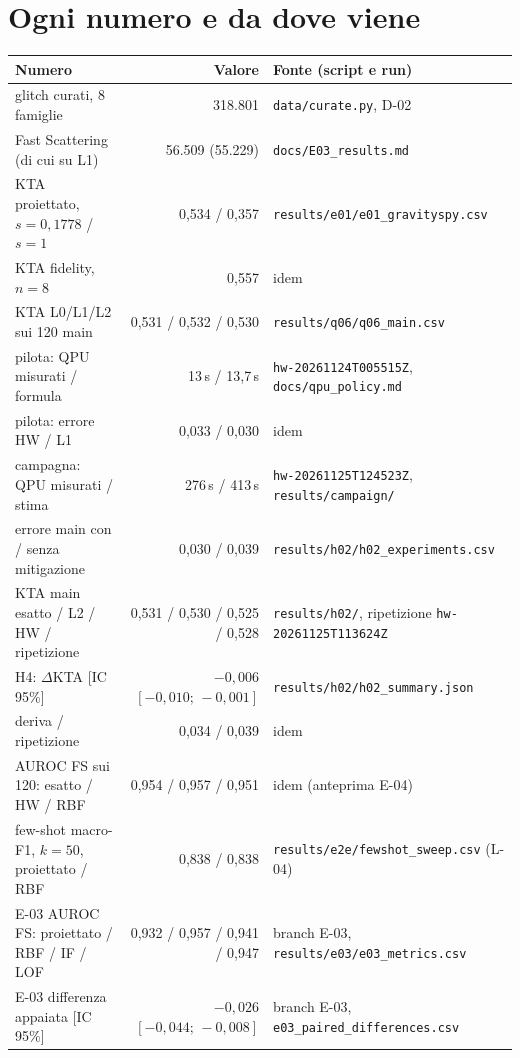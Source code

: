 \section{Ogni numero e da dove viene}
\label{app:numeri}

\begin{center}\small
\begin{tabularx}{\textwidth}{@{}>{\raggedright\arraybackslash}X r >{\raggedright\arraybackslash}p{6.2cm}@{}}
\toprule
Numero & Valore & Fonte (script e run)\\
\midrule
glitch curati, 8 famiglie & 318.801 & \texttt{data/curate.py}, D-02\\
Fast Scattering (di cui su L1) & 56.509 (55.229) & \texttt{docs/E03\_results.md}\\
KTA proiettato, $s=0{,}1778$ / $s=1$ & 0,534 / 0,357 & \texttt{results/e01/e01\_gravityspy.csv}\\
KTA fidelity, $n=8$ & 0,557 & idem\\
KTA L0/L1/L2 sui 120 main & 0,531 / 0,532 / 0,530 & \texttt{results/q06/q06\_main.csv}\\
pilota: QPU misurati / formula & 13\,s / 13,7\,s & \texttt{hw-20261124T005515Z}, \texttt{docs/qpu\_policy.md}\\
pilota: errore HW / L1 & 0,033 / 0,030 & idem\\
campagna: QPU misurati / stima & 276\,s / 413\,s & \texttt{hw-20261125T124523Z}, \texttt{results/campaign/}\\
errore main con / senza mitigazione & 0,030 / 0,039 & \texttt{results/h02/h02\_experiments.csv}\\
KTA main esatto / L2 / HW / ripetizione & 0,531 / 0,530 / 0,525 / 0,528 & \texttt{results/h02/}, ripetizione \texttt{hw-20261125T113624Z}\\
H4: $\Delta$KTA [IC 95\%] & $-0{,}006$ $[-0{,}010;\,-0{,}001]$ & \texttt{results/h02/h02\_summary.json}\\
deriva / ripetizione & 0,034 / 0,039 & idem\\
AUROC FS sui 120: esatto / HW / RBF & 0,954 / 0,957 / 0,951 & idem (anteprima E-04)\\
few-shot macro-F1, $k=50$, proiettato / RBF & 0,838 / 0,838 & \texttt{results/e2e/fewshot\_sweep.csv} (L-04)\\
E-03 AUROC FS: proiettato / RBF / IF / LOF & 0,932 / 0,957 / 0,941 / 0,947 & branch E-03, \texttt{results/e03/e03\_metrics.csv}\\
E-03 differenza appaiata [IC 95\%] & $-0{,}026$ $[-0{,}044;\,-0{,}008]$ & branch E-03, \texttt{e03\_paired\_differences.csv}\\
\bottomrule
\end{tabularx}
\end{center}

